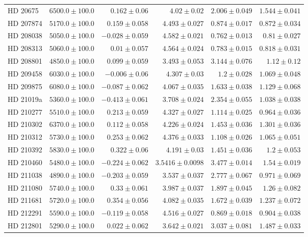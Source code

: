 \begin{longtable*}{lrrrrr}
HD 20675 & $6500.0\pm 100.0$ & $0.162\pm 0.06$ & $4.02\pm 0.02$ & $2.006\pm 0.049$ & $1.544\pm 0.041$ \\ 
HD 207874 & $5170.0\pm 100.0$ & $0.159\pm 0.058$ & $4.493\pm 0.027$ & $0.874\pm 0.017$ & $0.872\pm 0.034$ \\ 
HD 208038 & $5050.0\pm 100.0$ & $-0.028\pm 0.059$ & $4.582\pm 0.021$ & $0.762\pm 0.013$ & $0.81\pm 0.027$ \\ 
HD 208313 & $5060.0\pm 100.0$ & $0.01\pm 0.057$ & $4.564\pm 0.024$ & $0.783\pm 0.015$ & $0.818\pm 0.031$ \\ 
HD 208801 & $4850.0\pm 100.0$ & $0.099\pm 0.059$ & $3.493\pm 0.053$ & $3.144\pm 0.076$ & $1.12\pm 0.12$ \\ 
HD 209458 & $6030.0\pm 100.0$ & $-0.006\pm 0.06$ & $4.307\pm 0.03$ & $1.2\pm 0.028$ & $1.069\pm 0.048$ \\ 
HD 209875 & $6080.0\pm 100.0$ & $-0.087\pm 0.062$ & $4.067\pm 0.035$ & $1.633\pm 0.038$ & $1.129\pm 0.068$ \\ 
HD 21019a & $5360.0\pm 100.0$ & $-0.413\pm 0.061$ & $3.708\pm 0.024$ & $2.354\pm 0.055$ & $1.038\pm 0.038$ \\ 
HD 210277 & $5510.0\pm 100.0$ & $0.213\pm 0.059$ & $4.327\pm 0.027$ & $1.114\pm 0.025$ & $0.964\pm 0.036$ \\ 
HD 210302 & $6370.0\pm 100.0$ & $0.112\pm 0.058$ & $4.226\pm 0.024$ & $1.453\pm 0.036$ & $1.301\pm 0.036$ \\ 
HD 210312 & $5730.0\pm 100.0$ & $0.253\pm 0.062$ & $4.376\pm 0.033$ & $1.108\pm 0.026$ & $1.065\pm 0.051$ \\ 
HD 210392 & $5830.0\pm 100.0$ & $0.322\pm 0.06$ & $4.191\pm 0.03$ & $1.451\pm 0.036$ & $1.2\pm 0.053$ \\ 
HD 210460 & $5480.0\pm 100.0$ & $-0.224\pm 0.062$ & $3.5416\pm 0.0098$ & $3.477\pm 0.014$ & $1.54\pm 0.019$ \\ 
HD 211038 & $4890.0\pm 100.0$ & $-0.203\pm 0.059$ & $3.537\pm 0.037$ & $2.777\pm 0.067$ & $0.971\pm 0.069$ \\ 
HD 211080 & $5740.0\pm 100.0$ & $0.33\pm 0.061$ & $3.987\pm 0.037$ & $1.897\pm 0.045$ & $1.26\pm 0.082$ \\ 
HD 211681 & $5720.0\pm 100.0$ & $0.354\pm 0.056$ & $4.082\pm 0.035$ & $1.672\pm 0.039$ & $1.237\pm 0.072$ \\ 
HD 212291 & $5590.0\pm 100.0$ & $-0.119\pm 0.058$ & $4.516\pm 0.027$ & $0.869\pm 0.018$ & $0.904\pm 0.038$ \\ 
HD 212801 & $5290.0\pm 100.0$ & $0.022\pm 0.062$ & $3.642\pm 0.021$ & $3.037\pm 0.081$ & $1.487\pm 0.033$ \\ 

\end{longtable*}
